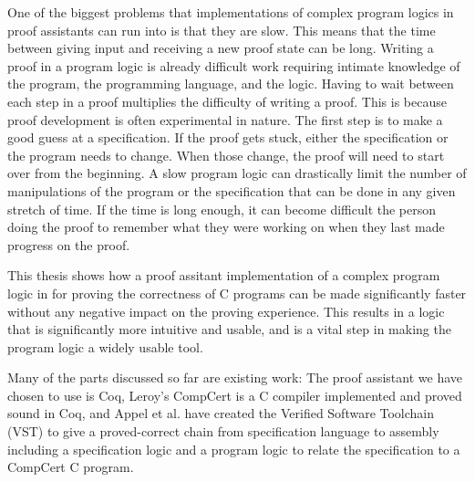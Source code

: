 \documentclass{puthesis}
\begin{document}
One of the biggest problems that implementations of complex program
logics in proof assistants can run into is that they are slow. This
means that the time between giving input and receiving a new proof
state can be long. Writing a proof in a program logic is already
difficult work requiring intimate knowledge of the program, the
programming language, and the logic. Having to wait between each step
in a proof multiplies the difficulty of writing a proof.  This is because proof
development is often experimental in nature. The first step is to make
a good guess at a specification. If the proof gets stuck, either the
specification or the program needs to change. When those change, the
proof will need to start over from the beginning. A slow program logic
can drastically limit the number of manipulations of the program or
the specification that can be done in any given stretch of time. If
the time is long enough, it can become difficult the person doing the
proof to remember what they were working on when they last made
progress on the proof.

This thesis shows how a proof assitant implementation of a complex
program logic in for proving the correctness of C programs can be made
significantly faster without any negative impact on the proving
experience. This results in a logic that is significantly more
intuitive and usable, and is a vital step in making the program logic
a widely usable tool.

Many of the parts discussed so far are existing work: The proof
assistant we have chosen to use is Coq, Leroy's CompCert
\cite{Leroy-Compcert-CACM} is a C compiler implemented and proved
sound in Coq, and Appel et al. \cite{appel14:plcc} have created the
Verified Software Toolchain (VST) to give a proved-correct chain from
specification language to assembly including a specification logic and
a program logic to relate the specification to a CompCert C program.
\end{document}
